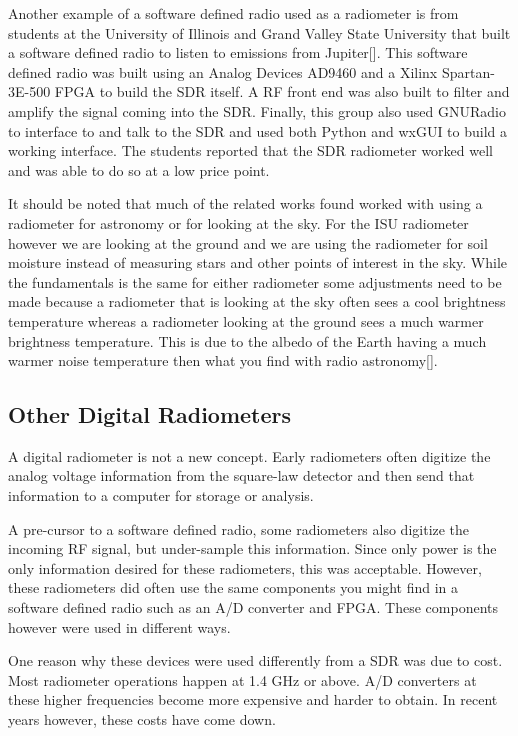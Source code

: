 Another example of a software defined radio used as a radiometer is from students at the University of Illinois and Grand Valley State University that built a software defined radio to listen to emissions from Jupiter[\cite{Behnke}].  This software defined radio was built using an Analog Devices AD9460 and a Xilinx Spartan-3E-500 FPGA to build the SDR itself.  A RF front end was also built to filter and amplify the signal coming into the SDR.  Finally, this group also used GNURadio to interface to and talk to the SDR and used both Python and wxGUI to build a working interface.  The students reported that the SDR radiometer worked well and was able to do so at a low price point.

It should be noted that much of the related works found worked with using a radiometer for astronomy or for looking at the sky.  For the ISU radiometer however we are looking at the ground and we are using the radiometer for soil moisture instead of measuring stars and other points of interest in the sky.  While the fundamentals is the same for either radiometer some adjustments need to be made because a radiometer that is looking at the sky often sees a cool brightness temperature whereas a radiometer looking at the ground sees a much warmer brightness temperature.  This is due to the albedo of the Earth having a much warmer noise temperature then what you find with radio astronomy[\cite{Tiuri}].
\subsection{Other Digital Radiometers}

A digital radiometer is not a new concept.  Early radiometers often digitize the analog voltage information from the square-law detector and then send that information to a computer for storage or analysis.  

A pre-cursor to a software defined radio, some radiometers also digitize the incoming RF signal, but under-sample this information.  Since only power is the only information desired for these radiometers, this was acceptable.  However, these radiometers did often use the same components you might find in a software defined radio such as an A/D converter and FPGA.  These components however were used in different ways.

One reason why these devices were used differently from a SDR was due to cost.  Most radiometer operations happen at 1.4 GHz or above.  A/D converters at these higher frequencies become more expensive and harder to obtain.  In recent years however, these costs have come down.

